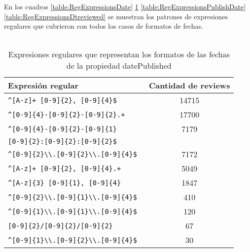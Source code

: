 En los cuadros \ref{table:RegExpressionsDate} \ref{table:RegExpressionsDatePublished} \ref{table:RegExpressionsPublishDate} \ref{table:RegExpressionsDtreviewed} se muestran los patrones de expresiones regulares que cubrieron con todos los casos de formatos 
de fechas.
\\
\\
\begin{table}[h]
\begin{tabular}{| l | c |} \hline
Expresión regular & Cantidad de reviews\\\hline
\verb|^[A-z]+ [0-9]{2}, [0-9]{4}$ |& 14715 \\\hline
\verb|^[0-9]{4}-[0-9]{2}-[0-9]{2}.+ |& 17700 \\\hline
\verb|^[0-9]{4}-[0-9]{2}-[0-9]{1} |& 7179 \\ \verb|[0-9]{2}:[0-9]{2}:[0-9]{2}$| & \\\hline
\verb|^[0-9]{2}\\.[0-9]{2}\\.[0-9]{4}$ |& 7172\\\hline
\verb|^[A-z]+ [0-9]{2}, [0-9]{4}.+ |& 5049\\\hline
\verb|^[A-z]{3} [0-9]{1}, [0-9]{4} |& 1847\\\hline
\verb|^[0-9]{2}\\.[0-9]{1}\\.[0-9]{4}$ |& 410\\\hline
\verb|^[0-9]{1}\\.[0-9]{1}\\.[0-9]{4}$ |& 120\\\hline
\verb|[0-9]{2}/[0-9]{2}/[0-9]{2} |& 67\\\hline
\verb|^[0-9]{1}\\.[0-9]{2}\\.[0-9]{4}$ |& 30 \\\hline
\end{tabular}
\caption{Expresiones regulares que representan los formatos de las fechas de la propiedad datePublished}
\label{table:RegExpressionsDatePublished}
\end{table}
